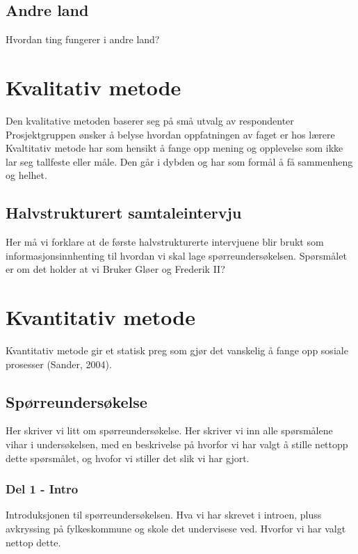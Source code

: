 \subsection{Andre land}
{\color {red} Hvordan ting fungerer i andre land?}



\section{Kvalitativ metode}

Den kvalitative metoden baserer seg på små utvalg av respondenter
Prosjektgruppen ønsker å belyse hvordan oppfatningen av faget er hos lærere
Kvaltitativ metode har som hensikt å fange opp mening og opplevelse som ikke lar seg tallfeste eller måle. Den går i dybden og har som formål å få sammenheng og helhet.

\subsection{Halvstrukturert samtaleintervju}
{\color{red} Her må vi forklare at de første halvstrukturerte intervjuene blir brukt som informasjonsinnhenting til hvordan vi skal lage spørreundersøkelsen. Spørsmålet er om det holder at vi Bruker Gløer og Frederik II?  }




\section{Kvantitativ metode}

Kvantitativ metode gir et statisk preg som gjør det vanskelig å fange opp sosiale prosesser (Sander, 2004). 
{\color{red} }


\subsection{Spørreundersøkelse}
{\color{red} Her skriver vi litt om spørreundersøkelse. Her skriver vi inn alle spørsmålene vihar i undersøkelsen, med en beskrivelse på hvorfor vi har valgt å stille nettopp dette spørsmålet, og hvofor vi stiller det slik vi har gjort.}

\subsubsection{Del 1 - Intro}
{\color{red} Introduksjonen til spørreundersøkelsen. Hva vi har skrevet i introen, pluss avkryssing på fylkeskommune og skole det undervisese ved. Hvorfor vi har valgt nettop dette.  }


